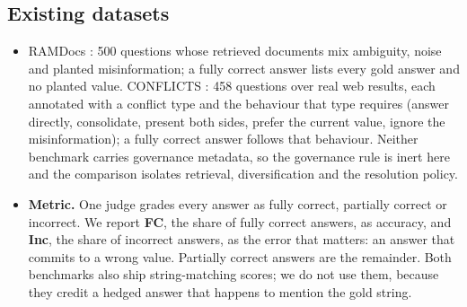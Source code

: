 \documentclass[11pt]{article}
\begin{document}
\subsection{Existing datasets}
\begin{itemize}
  \item RAMDocs \citep{wang2025ramdocs}: 500 questions whose retrieved
        documents mix ambiguity, noise and planted misinformation; a fully
        correct answer lists every gold answer and no planted value.
        CONFLICTS \citep{cattan2025conflicts}: 458 questions over real web
        results, each annotated with a conflict type and the behaviour that
        type requires (answer directly, consolidate, present both sides,
        prefer the current value, ignore the misinformation); a fully correct
        answer follows that behaviour. Neither benchmark carries governance
        metadata, so the governance rule is inert here and the comparison
        isolates retrieval, diversification and the resolution policy.
  \item \textbf{Metric.} One judge grades every answer as fully correct,
        partially correct or incorrect. We report \textbf{FC}, the share of
        fully correct answers, as accuracy, and \textbf{Inc}, the share of
        incorrect answers, as the error that matters: an answer that commits
        to a wrong value. Partially correct answers are the remainder. Both
        benchmarks also ship string-matching scores; we do not use them,
        because they credit a hedged answer that happens to mention the gold
        string.
\end{itemize}
\end{document}
